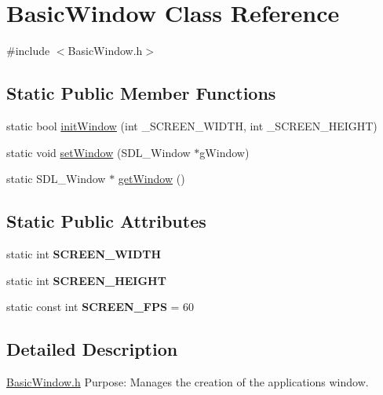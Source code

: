 \hypertarget{class_basic_window}{}\section{Basic\+Window Class Reference}
\label{class_basic_window}


{\ttfamily \#include $<$Basic\+Window.\+h$>$}

\subsection*{Static Public Member Functions}
\begin{DoxyCompactItemize}
\item 
static bool \hyperlink{class_basic_window_a3b44337e63449c56d60f17ac27f9ccf9}{init\+Window} (int \+\_\+\+S\+C\+R\+E\+E\+N\+\_\+\+W\+I\+D\+T\+H, int \+\_\+\+S\+C\+R\+E\+E\+N\+\_\+\+H\+E\+I\+G\+H\+T)
\item 
static void \hyperlink{class_basic_window_ab97041d3e4003aa4dd534f94ff397a75}{set\+Window} (S\+D\+L\+\_\+\+Window $\ast$g\+Window)
\item 
static S\+D\+L\+\_\+\+Window $\ast$ \hyperlink{class_basic_window_a29bbe2dfe79ff2d054823b2e8ae27b4d}{get\+Window} ()
\end{DoxyCompactItemize}
\subsection*{Static Public Attributes}
\begin{DoxyCompactItemize}
\item 
\hypertarget{class_basic_window_ac533610319f94eea462799fffa548d65}{}static int {\bfseries S\+C\+R\+E\+E\+N\+\_\+\+W\+I\+D\+T\+H}\label{class_basic_window_ac533610319f94eea462799fffa548d65}

\item 
\hypertarget{class_basic_window_a61ac5c2fe46167475fd5f3159d3cfcf6}{}static int {\bfseries S\+C\+R\+E\+E\+N\+\_\+\+H\+E\+I\+G\+H\+T}\label{class_basic_window_a61ac5c2fe46167475fd5f3159d3cfcf6}

\item 
\hypertarget{class_basic_window_a41eaeb4d636442bd68abe0fe479aa911}{}static const int {\bfseries S\+C\+R\+E\+E\+N\+\_\+\+F\+P\+S} = 60\label{class_basic_window_a41eaeb4d636442bd68abe0fe479aa911}

\end{DoxyCompactItemize}


\subsection{Detailed Description}
\hyperlink{_basic_window_8h_source}{Basic\+Window.\+h} Purpose\+: Manages the creation of the application\textquotesingle{}s window.

